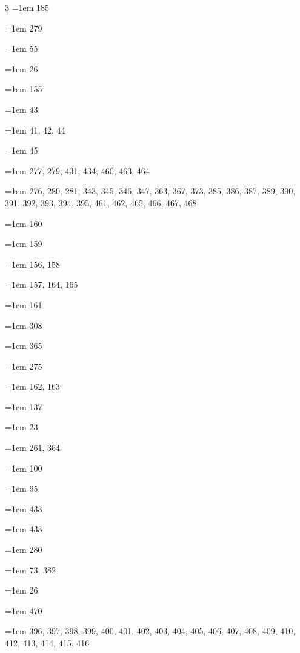 \begin{multicols}{3}
\hangindent=1em  185\par
\hangindent=1em  279\par
\hangindent=1em  55\par
\hangindent=1em  26\par
\hangindent=1em  155\par
\hangindent=1em  43\par
\hangindent=1em  41, 42, 44\par
\hangindent=1em  45\par
\hangindent=1em  277, 279, 431, 434, 460, 463, 464\par
\hangindent=1em  276, 280, 281, 343, 345, 346, 347, 363, 367, 373, 385, 386, 387, 389, 390, 391, 392, 393, 394, 395, 461, 462, 465, 466, 467, 468\par
\hangindent=1em  160\par
\hangindent=1em  159\par
\hangindent=1em  156, 158\par
\hangindent=1em  157, 164, 165\par
\hangindent=1em  161\par
\hangindent=1em  308\par
\hangindent=1em  365\par
\hangindent=1em  275\par
\hangindent=1em  162, 163\par
\hangindent=1em  137\par
\hangindent=1em  23\par
\hangindent=1em  261, 364\par
\hangindent=1em  100\par
\hangindent=1em  95\par
\hangindent=1em  433\par
\hangindent=1em  433\par
\hangindent=1em  280\par
\hangindent=1em  73, 382\par
\hangindent=1em  26\par
\hangindent=1em  470\par
\hangindent=1em  396, 397, 398, 399, 400, 401, 402, 403, 404, 405, 406, 407, 408, 409, 410, 412, 413, 414, 415, 416\par

\end{multicols}
